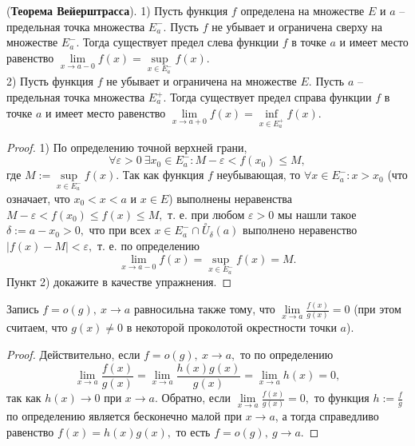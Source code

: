 \begin{theorem} (\textbf{Теорема Вейерштрасса}).
    1) Пусть функция $f$ определена на множестве $E$
    и $a$ -- предельная точка
    множества $E^-_a.$
    Пусть $f$ не убывает и ограничена сверху
    на множестве $E^-_a.$ Тогда существует предел слева
    функции $f$ в точке $a$ и имеет место равенство
    $
        \lim\limits_{x\rightarrow a-0}f(x)=
        \sup\limits_{x \in E^-_a}f(x).
    $\\
    2) Пусть функция $f$ не убывает и ограничена
    на множестве $E.$ Пусть $a$ -- предельная точка
    множества $E^+_a.$ Тогда существует предел справа
    функции $f$ в точке $a$ и имеет место равенство
    $
        \lim\limits_{x\rightarrow a+0}f(x)=
        \inf\limits_{x \in E^+_a}f(x).
    $
\end{theorem}
\begin{proof}
    1) По определению точной верхней грани,
    $$\forall\varepsilon>0 \ \exists x_0 \in
        E^-_a: M-\varepsilon < f(x_0)\leq M,$$ где
    $M:=\sup\limits_{x \in E^-_a}f(x).$
    Так как функция $f$ неубывающая, то
    $\forall x \in E^-_a: x>x_0$ (что означает,
    что $x_0<x<a$ и $x \in E$) выполнены
    неравенства $M-\varepsilon<f(x_0)\leq f(x)
        \leq M,$ т. е. при любом $\varepsilon>0$
    мы нашли такое $\delta:= a-x_0>0,$ что
    при всех $x \in E^-_a\cap
        \stackrel{\circ}{U}_{\delta}(a)$
    выполнено неравенство $|f(x)-M|<\varepsilon,$
    т. е. по определению
    $$
        \lim\limits_{x\rightarrow a-0}f(x)=
        \sup\limits_{x \in E^-_a}f(x)=M.
    $$
    Пункт 2) докажите в качестве упражнения.
\end{proof}

\begin{proposition}
    Запись $f=o(g), \ x\rightarrow a$ равносильна
    также тому,
    что $\lim\limits_{x\rightarrow a}
        \frac{f(x)}{g(x)}=0$
    (при этом считаем, что $g(x)\neq0$
    в некоторой проколотой окрестности
    точки $a$).
\end{proposition}
\begin{proof}
    Действительно,
    если $f=o(g), \ x\rightarrow a,$ то
    по определению
    $$
        \lim\limits_{x\rightarrow a}
        \frac{f(x)}{g(x)}=
        \lim\limits_{x\rightarrow a}
        \frac{h(x)g(x)}{g(x)}=
        \lim\limits_{x\rightarrow a}
        h(x)=0,
    $$
    так как $h(x)\rightarrow 0$
    при $x\rightarrow a.$ Обратно,
    если $\lim\limits_{x\rightarrow a}
        \frac{f(x)}{g(x)}=0,$ то функция
    $h:=\frac{f}{g}$ по
    определению является бесконечно малой
    при $x\rightarrow a$,
    а тогда справедливо равенство
    $f(x)=h(x)g(x),$ то есть $f=o(g), \
        g\rightarrow a.$
\end{proof}


